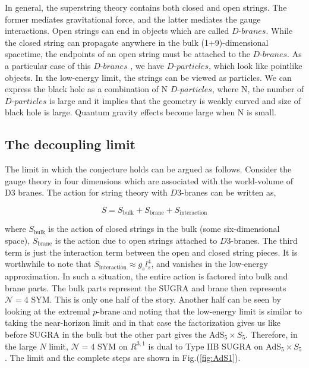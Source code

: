In general, the superstring theory contains both closed and open strings. The former mediates gravitational force, and the latter mediates the gauge interactions. 
Open strings can end in objects which are called $\textit{D-branes}$. While the closed string can propagate anywhere in the bulk (1+9)-dimensional spacetime, 
the endpoints of an open string must be attached to the $\textit{D-branes}$.  As a particular case of this $\textit{D-branes }$, we have $\textit{D-particles}$, 
which look like pointlike objects. In the low-energy limit, the strings can be viewed as particles. We can express the black hole as a combination of N $\textit{D-particles}$, 
where N, the number of $\textit{D-particles}$ is large and it implies that the geometry is weakly curved and size of black hole is large. Quantum gravity effects become
large when N is small. 



\subsection{The decoupling limit} 

The limit in which the conjecture holds can be argued as follows. Consider the gauge theory in four dimensions which are associated with the world-volume of D3 branes. 
The action for string theory with $D3$-branes can be written as, 

\begin{equation}
S = S_{\text{bulk}} + S_{\text{brane}}  + S_{\text{interaction}} 
\end{equation}

where $ S_{\text{bulk}}$ is the action of closed strings in the bulk (some six-dimensional space), 
$S_{\text{brane}}$ is the action due to open strings attached to $D3$-branes. The third term is just the interaction term between
the open and closed string pieces. It is worthwhile to note that $S_{\text{interaction}} \approx g_{s} l_{s}^4$, and vanishes
in the low-energy approximation. In such a situation, the entire action is factored into bulk and brane parts. 
The bulk parts represent the SUGRA and brane then represents $\mathcal{N}=4$ SYM. 
This is only one half of the story. Another half can be seen by looking at the extremal $p$-brane 
and noting that the low-energy limit is similar to taking the near-horizon limit and in that case the 
factorization gives us like before SUGRA in the bulk
but the other part gives the AdS$_5 \times S_5$.
Therefore, in the large $N$ limit, $\mathcal{N}=4$ SYM on $R^{3,1}$ is dual to Type IIB SUGRA on AdS$_5 \times S_5$.
The limit and the complete steps are shown in Fig.(\ref{fig:AdS1}). 

